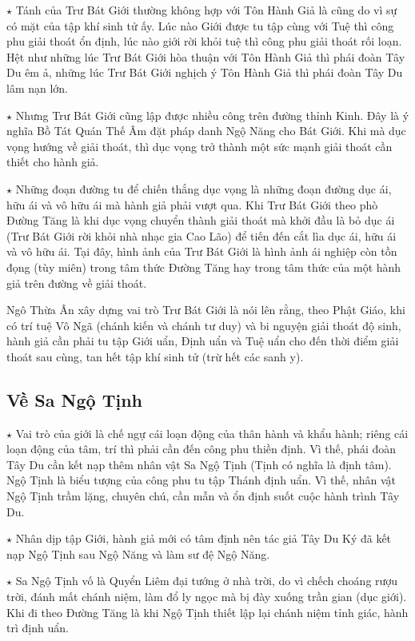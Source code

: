 $\star$ Tánh của Trư Bát Giới thường không hợp với Tôn Hành Giả là cũng do vì sự có mặt của tập khí sinh tử ấy. Lúc nào Giới được tu tập cùng với Tuệ thì công phu giải thoát ổn định, lúc nào giới rời khỏi tuệ thì công phu giải thoát rối loạn. Hệt như những lúc Trư Bát Giới hòa thuận với Tôn Hành Giả thì phái đoàn Tây Du êm ả, những lúc Trư Bát Giới nghịch ý Tôn Hành Giả thì phái đoàn Tây Du lâm nạn lớn.

$\star$ Nhưng Trư Bát Giới cũng lập được nhiều công trên đường thỉnh Kinh. Đây là ý nghĩa Bồ Tát Quán Thế Âm đặt pháp danh Ngộ Năng cho Bát Giới. Khi mà dục vọng hướng về giải thoát, thì dục vọng trở thành một sức mạnh giải thoát cần thiết cho hành giả.

$\star$ Những đoạn đường tu để chiến thắng dục vọng là những đoạn đường dục ái, hữu ái và vô hữu ái mà hành giả phải vượt qua. Khi Trư Bát Giới theo phò Đường Tăng là khi dục vọng chuyển thành giải thoát mà khởi đầu là bỏ dục ái (Trư Bát Giới rời khỏi nhà nhạc gia Cao Lão) để tiến đến cắt lìa dục ái, hữu ái và vô hữu ái. Tại đây, hình ảnh của Trư Bát Giới là hình ảnh ái nghiệp còn tồn đọng (tùy miên) trong tâm thức Đường Tăng hay trong tâm thức của một hành giả trên đường về giải thoát.

Ngô Thừa Ân xây dựng vai trò Trư Bát Giới là nói lên rằng, theo Phật Giáo, khi có trí tuệ Vô Ngã (chánh kiến và chánh tư duy) và bi nguyện giải thoát độ sinh, hành giả cần phải tu tập Giới uẩn, Định uẩn và Tuệ uẩn cho đến thời điểm giải thoát sau cùng, tan hết tập khí sinh tử (trừ hết các sanh y).

\subsection{Về Sa Ngộ Tịnh} %
\label{sub:ve_sa_ngo_tinh}

$\star$ Vai trò của giới là chế ngự cái loạn động của thân hành và khẩu hành; riêng cái loạn động của tâm, trí thì phải cần đến công phu thiền định. Vì thế, phái đoàn Tây Du cần kết nạp thêm nhân vật Sa Ngộ Tịnh (Tịnh có nghĩa là định tâm). Ngộ Tịnh là biểu tượng của công phu tu tập Thánh định uẩn. Vì thế, nhân vật Ngộ Tịnh trầm lặng, chuyên chú, cần mẫn và ổn định suốt cuộc hành trình Tây Du.

$\star$ Nhân dịp tập Giới, hành giả mới có tâm định nên tác giả Tây Du Ký đã kết nạp Ngộ Tịnh sau Ngộ Năng và làm sư đệ Ngộ Năng.

$\star$ Sa Ngộ Tịnh vố là Quyển Liêm đại tướng ở nhà trời, do vì chếch choáng rượu trời, đánh mất chánh niệm, làm đổ ly ngọc mà bị đày xuống trần gian (dục giới). Khi đi theo Đường Tăng là khi Ngộ Tịnh thiết lập lại chánh niệm tỉnh giác, hành trì định uẩn.

